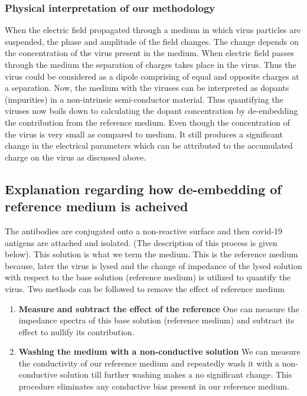 \documentclass{FR16}
\begin{document}
\subsubsection{Physical interpretation of our methodology}
When the electric field propagated through a medium in which virus particles are suspended, the phase and amplitude of the field changes. The change depends on the concentration of the virus present in the medium. When electric field passes through the medium the separation of charges takes place in the virus. Thus the virus could be considered as a dipole comprising of equal and opposite charges at a separation. Now, the medium with the viruses can be interpreted as dopants (impurities) in a non-intrinsic semi-conductor material. Thus quantifying the viruses now boils down to calculating the dopant concentration by de-embedding the contribution from the reference medium. Even though the concentration of the virus is very small as compared to medium. It still produces a significant change in the electrical parameters which can be attributed to the accumulated charge on the virus as discussed above.

\subsection{Explanation regarding how de-embedding of reference medium is acheived}
The antibodies are conjugated onto a non-reactive surface and then covid-19 antigens are attached and isolated. (The description of this process is given below). This solution is what we term the medium. This is the reference medium because, later the virus is lysed and the change of impedance of the lysed solution  with respect to the  base solution (reference medium) is utilized to quantify the virus.  Two methods can  be followed to remove the effect of reference medium

\begin{enumerate}
    \item \textbf{Measure and subtract the effect of the reference} One can measure  the impedance spectra of this base solution (reference medium) and subtract its effect to nullify its contribution.
    
    \item \textbf{Washing the medium with a non-conductive solution} We can measure the conductivity of our reference medium and repeatedly wash it with a non-conductive solution  till further washing makes a no significant change. This procedure eliminates any conductive bias present in our reference medium.
\end{enumerate}
\end{document}
